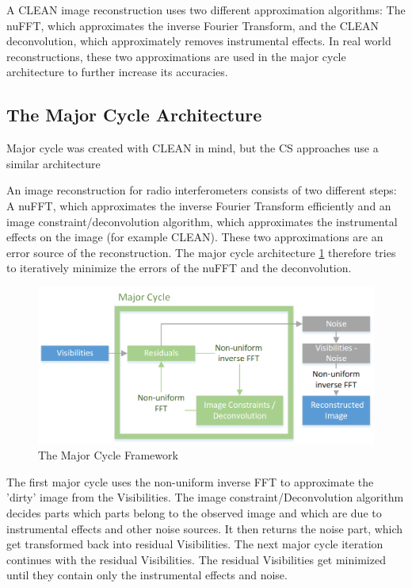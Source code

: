 A CLEAN image reconstruction uses two different approximation algorithms: The nuFFT, which approximates the inverse Fourier Transform, and the CLEAN deconvolution, which approximately removes instrumental effects. In real world reconstructions, these two approximations are used in the major cycle architecture to further increase its accuracies.

\subsection{The Major Cycle Architecture}
Major cycle was created with CLEAN in mind, but the CS approaches use a similar architecture

An image reconstruction for radio interferometers consists of two different steps: A nuFFT, which approximates the inverse Fourier Transform efficiently and an image constraint/deconvolution algorithm, which approximates the instrumental effects on the image (for example CLEAN). These two approximations are an error source of the reconstruction. The major cycle architecture \ref{intro:major} therefore tries to iteratively minimize the errors of the nuFFT and the deconvolution.

\begin{figure}
	\centering
	\vspace{-10pt}
	\includegraphics[width=1.0\linewidth]{./chapters/01.intro/Major-Minor.png}
	\caption{The Major Cycle Framework}
	\label{intro:major}
	\vspace{-10pt}
\end{figure}

The first major cycle uses the non-uniform inverse FFT to approximate the 'dirty' image from the Visibilities. The image constraint/Deconvolution algorithm decides parts which parts belong to the observed image and which are due to instrumental effects and other noise sources. It then returns the noise part, which get transformed back into residual Visibilities. The next major cycle iteration continues with the residual Visibilities. The residual Visibilities get minimized until they contain only the instrumental effects and noise.

